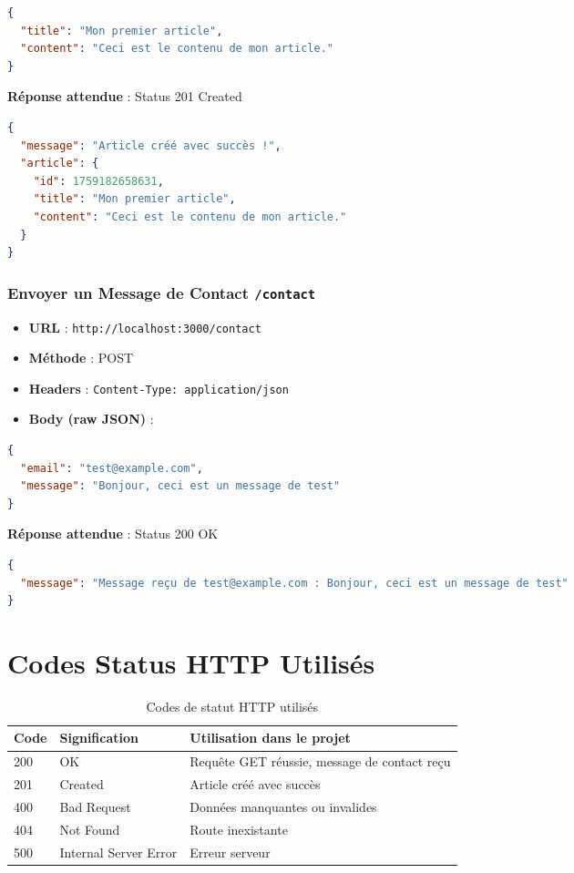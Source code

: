\documentclass[12pt,a4paper]{article}
\begin{document}
\begin{lstlisting}[language=json]
{
  "title": "Mon premier article",
  "content": "Ceci est le contenu de mon article."
}
\end{lstlisting}

\textbf{Réponse attendue} : Status 201 Created

\begin{lstlisting}[language=json]
{
  "message": "Article créé avec succès !",
  "article": {
    "id": 1759182658631,
    "title": "Mon premier article",
    "content": "Ceci est le contenu de mon article."
  }
}
\end{lstlisting}

\subsubsection{Envoyer un Message de Contact \texttt{/contact}}
\begin{itemize}
    \item \textbf{URL} : \texttt{http://localhost:3000/contact}
    \item \textbf{Méthode} : POST
    \item \textbf{Headers} : \texttt{Content-Type: application/json}
    \item \textbf{Body (raw JSON)} :
\end{itemize}

\begin{lstlisting}[language=json]
{
  "email": "test@example.com",
  "message": "Bonjour, ceci est un message de test"
}
\end{lstlisting}

\textbf{Réponse attendue} : Status 200 OK

\begin{lstlisting}[language=json]
{
  "message": "Message reçu de test@example.com : Bonjour, ceci est un message de test"
}
\end{lstlisting}

\section{Codes Status HTTP Utilisés}

\begin{table}[h!]
\centering
\begin{tabular}{@{}lll@{}}
\toprule
\textbf{Code} & \textbf{Signification} & \textbf{Utilisation dans le projet} \\
\midrule
200 & OK & Requête GET réussie, message de contact reçu \\
201 & Created & Article créé avec succès \\
400 & Bad Request & Données manquantes ou invalides \\
404 & Not Found & Route inexistante \\
500 & Internal Server Error & Erreur serveur \\
\bottomrule
\end{tabular}
\caption{Codes de statut HTTP utilisés}
\end{table}
\end{document}
